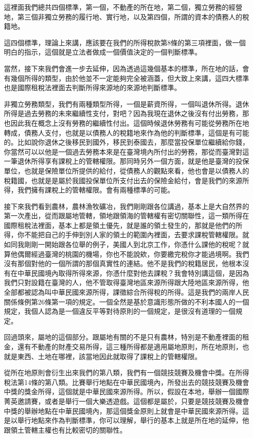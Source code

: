 \documentclass[oneside,sub3section]{ctexbook}
\begin{document}
這裡面我們總共四個標準，第一個，不動產的所在地，第二個，獨立勞務的經營地，第三個非獨立勞務的履行地、實行地，以及第四個，所謂的資本的債務人的稅籍地。

這四個標準，理論上來講，應該要在我們的所得稅款第8條的第三項裡面，做一個明白的指示，這個就是立法者做成一個價值決定的一個判斷標準。

當然，接下來我們會進一步去延伸，因為透過這幾個基本的標準，所在地的話，會有幾個所得的類型，由於他並不一定能夠完全被涵蓋，但大致上來講，這四大標準也是國際租稅法裡面去判斷所得來源地的來源地判斷標準。

非獨立勞務類型，我們有兩種類型所得，一個是薪資所得，一個叫退休所得。退休所得是過去勞務的未來繼續性支付，對吧？因為我現在退休之後沒有付出勞務，那也因此我在概念上沒有勞務的繼續性付出。這個時候退休勞務有可能從勞務所在地轉成，債務人支付，也就是以債務人的稅籍地來作為他的判斷標準，這個是有可能的。比如說你退休之後移民到國外，移民到泰國去，那麼當投保單位繼續給你錢，你當然可以以他是一個過去勞務本來是在臺灣境內所付出的勞務，那從而臺灣對這一筆退休所得享有課稅上的管轄權限。那同時另外一個方面，就是他是臺灣的投保單位，也就是保險單位所提供的給付，從債務人的觀點來看，他也會是以債務人的稅籍國，也就是是屬於我國投保單位所支付出去的保險金給付，會是我們的來源所得，我們擁有課稅上的管轄權限。會有兩種標準的可能。

接下來我們看到農林，農林漁牧礦冶，我們剛剛跟各位講過，基本上是大自然界的第一次產出，從而跟屬地管轄，領地跟領海的管轄權有密切關聯性，這一類所得在國際租稅法裡面，基本上都是領土優先，就是誰的領土發生的，那就是他們的所得，你不能把自己的手伸到別人家的領土的範圍內裡面，去要求課稅管轄權限。就如同我剛剛一開始跟各位舉的例子，美國人到北京工作，你憑什么課他的稅呢？就算他偶爾經過臺灣的桃園的機場，你也不能說欸，你要繳完稅你才能過境啊。我們沒有那個對他的一個所謂的那個真實性的連結。他不是我們的稅籍居民，他根本沒有在中華民國境內取得所得來源，你憑什麼對他去課稅？我會特別講這個，是因為我們只對設籍在臺灣的人，他不管取得臺灣地區來源所得跟大陸地區來源所得，他全部都被認為叫中華民國來源所得，課徵綜合所得稅的所得。這是我們的兩岸人民關係條例第26條第一項的規定。一個全然是基於意識形態所做的不利本國人的一個規定，我個人認為是一個違反平等對待原則的一個規定，是很沒有道理的一個規定。

回過頭來，屬地的這個部分。跟屬地有關的不是只有農林，特別是不動產裡面的租金，還有不動產的財產交易所得，這三種所得都是適用屬地原則，所在地原則，也就是東西、土地在哪裡，該當地因此就取得了課稅上的管轄權限。

從所在地原則會衍生出來我們的第八類，我們有一個競技競賽及機會中獎。在所得稅法第14條的第八類。比賽舉行地點在中華民國境內，所發出去的競技競賽及機會中獎的獎金所得，這個就是中華民國來源所得。所以，假設在本地，舉辦一個國際菁英邀請賽，或者是舉行一個大樂透遊戲。這個都是屬於，只要是競技競賽及機會中獎的舉辦地點在中華民國境內，那這個獎金原則上就會是中華民國來源所得。這是以舉行地點來作為判斷標準，你可以理解，舉行的基本上就是所在地的延伸，他跟領土管轄主權也有比較密切的關聯性。
\end{document}
